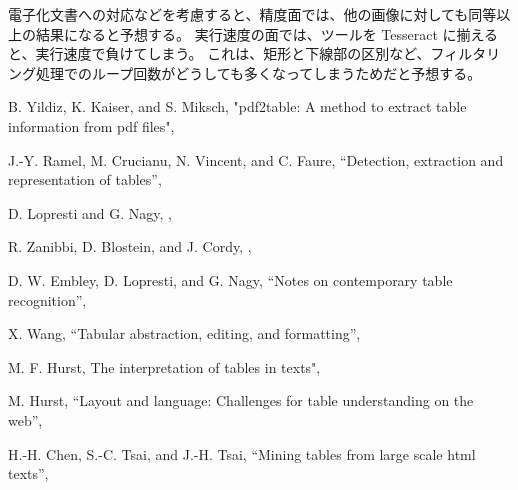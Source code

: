 \documentclass[uplatex, twocolumn,10pt]{jsarticle}
\begin{document}
電子化文書への対応などを考慮すると、精度面では、他の画像に対しても同等以上の結果になると予想する。
実行速度の面では、ツールを Tesseract に揃えると、実行速度で負けてしまう。
これは、矩形と下線部の区別など、フィルタリング処理でのループ回数がどうしても多くなってしまうためだと予想する。


\begin{thebibliography}{99}
    B. Yildiz, K. Kaiser, and S. Miksch,
    \newblock "pdf2table: A method to extract table information from pdf files",

    J.-Y. Ramel, M. Crucianu, N. Vincent, and C. Faure,
    \newblock “Detection, extraction and representation of tables”,
    
    D. Lopresti and G. Nagy,
    ,

    R. Zanibbi, D. Blostein, and J. Cordy,
    ,

    D. W. Embley, D. Lopresti, and G. Nagy,
    \newblock “Notes on contemporary table recognition”,

    X. Wang,
    \newblock “Tabular abstraction, editing, and formatting”,
    
    M. F. Hurst,
    \newblock The interpretation of tables in texts",
    
    M. Hurst,
    \newblock “Layout and language: Challenges for table understanding on the web”,
    
    H.-H. Chen, S.-C. Tsai, and J.-H. Tsai,
    \newblock “Mining tables from large scale html texts”,
    

\end{thebibliography}
\end{document}
